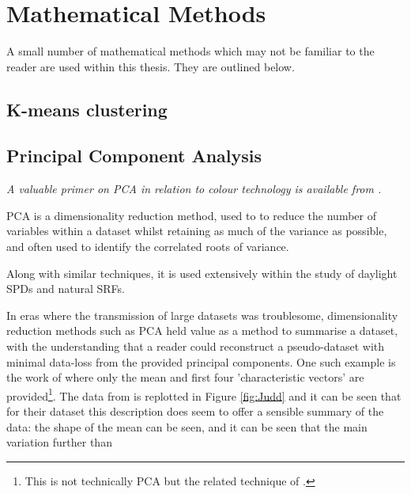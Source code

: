\section{Mathematical Methods}

A small number of mathematical methods which may not be familiar to the reader are used within this thesis. They are outlined below.

\subsection{K-means clustering}

\subsection{Principal Component Analysis}

\textit{A valuable primer on \gls{PCA} in relation to colour technology is available from \citet{tzeng_review_2005}.}

\Gls{PCA} is a dimensionality reduction method, used to to reduce the number of variables within a dataset whilst retaining as much of the variance as possible, and often used to identify the correlated roots of variance.

Along with similar techniques, it is used extensively within the study of daylight \glspl{SPD}\citep{hernandez-andres_color_2001,ojeda_influence_2012,pant_estimating_2009,bui_group_2004,judd_spectral_1964,maloney_computational_1984,spitschan_variation_2016} and natural \glspl{SRF}\citep{maloney_computational_1984,dzmura_color_1992,maloney_evaluation_1986,maloney_color_1986,cohen_dependency_1964,ferrero_principal_2011,zhang_reconstructing_2008,kwon_surface_2007,agahian_reconstruction_2008,harifi_recovery_2008,parkkinen_characteristic_1989,vrhel_color_1992,fairman_principal_2004,ayala_use_2006,eem_reconstruction_1994-2,connah_multispectral_2006,shi_using_2002,morovic_metamer-set-based_2006}. 

In eras where the transmission of large datasets was troublesome, dimensionality reduction methods such as \gls{PCA} held value as a method to summarise a dataset, with the understanding that a reader could reconstruct a pseudo-dataset with minimal data-loss from the provided principal components. One such example is the work of \citet{judd_spectral_1964} where only the mean and first four 'characteristic vectors' are provided\footnote{This is not technically \gls{PCA} but the related technique of \citet{morris_objective_1954}.}. The data from \citet{judd_spectral_1964} is replotted in Figure \ref{fig:Judd} and it can be seen that for their dataset this description does seem to offer a sensible summary of the data: the shape of the mean can be seen, and it can be seen that the main variation further than 

